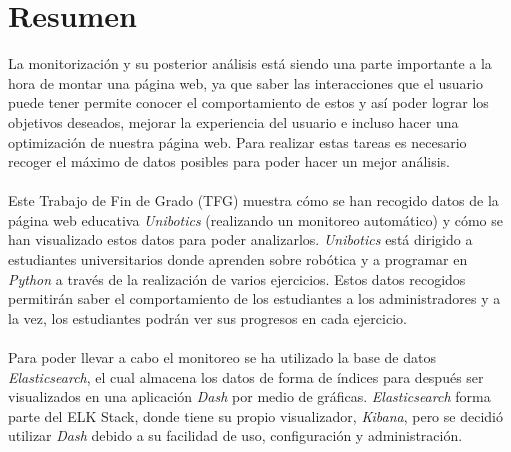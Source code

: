 \newpage
\thispagestyle{plain}			%
\setlength{\parskip}{0pt plus 1.0pt}
\section*{Resumen}

La monitorización y su posterior análisis está siendo una parte importante a la hora de montar una página web, ya que saber las interacciones que el usuario puede tener permite conocer el comportamiento de estos y así poder lograr los objetivos deseados, mejorar la experiencia del usuario e incluso hacer una optimización de nuestra página web. Para realizar estas tareas es necesario recoger el máximo de datos posibles para poder hacer un mejor análisis.
\\
 \\
Este Trabajo de Fin de Grado (TFG) muestra cómo se han recogido datos de la página web educativa \textit{Unibotics} (realizando un monitoreo automático) y cómo se han visualizado estos datos para poder analizarlos. \textit{Unibotics} está dirigido a estudiantes universitarios donde aprenden sobre robótica y a programar en \textit{Python }a través de la realización de varios ejercicios. Estos datos recogidos permitirán saber el comportamiento de los estudiantes a los administradores y a la vez, los estudiantes podrán ver sus progresos en cada ejercicio.
\\
\\
Para poder llevar a cabo el monitoreo se ha utilizado la base de datos \textit{Elasticsearch}, el cual almacena los datos de forma de índices para después ser visualizados en una aplicación \textit{Dash} por medio de gráficas. \textit{Elasticsearch} forma parte del ELK Stack, donde tiene su propio visualizador, \textit{Kibana}, pero se decidió utilizar \textit{Dash} debido a su facilidad de uso, configuración y administración.


